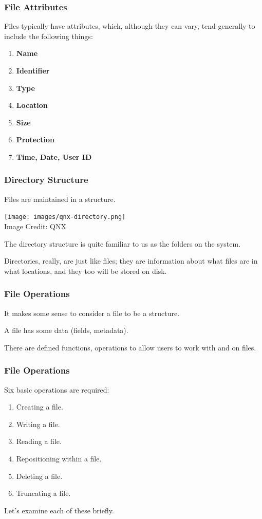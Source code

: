 \begin{frame}
	\frametitle{File Attributes}

	Files typically have attributes, which, although they can vary, tend generally to include the following things:

	\begin{enumerate}
		\item \textbf{Name}
		\item \textbf{Identifier}
		\item \textbf{Type}
		\item \textbf{Location}
		\item \textbf{Size}
		\item \textbf{Protection}
		\item \textbf{Time, Date, User ID}
	\end{enumerate}


\end{frame}

\begin{frame}
	\frametitle{Directory Structure}

	Files are maintained in a structure.

	\begin{center}
		\texttt{[image: images/qnx-directory.png]}\\
		{\footnotesize Image Credit: QNX}
	\end{center}



	The directory structure is quite familiar to us as the folders on the system.

	Directories, really, are just like files; they are information about what files are in what locations, and they too will be stored on disk.


\end{frame}

\begin{frame}
	\frametitle{File Operations}

	It makes some sense to consider a file to be a structure.

	A file has some data (fields, metadata).

	There are defined functions, operations to allow users to work with and on files.

\end{frame}

\begin{frame}
	\frametitle{File Operations}
	Six basic operations are required:

	\begin{enumerate}
		\item Creating a file.
		\item Writing a file.
		\item Reading a file.
		\item Repositioning within a file.
		\item Deleting a file.
		\item Truncating a file.
	\end{enumerate}

	Let's examine each of these briefly.

\end{frame}


